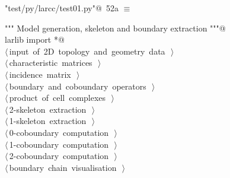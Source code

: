 \documentclass[11pt,oneside]{article}    %
\begin{document}
\begin{flushleft} \small \label{scrap85}
\protect{}\verb@"test/py/larcc/test01.py"@\nobreak\ {\footnotesize 52a }$\equiv$
\vspace{-1ex}
\begin{list}{}{} \item
\mbox{}\verb@""" Model generation, skeleton and boundary extraction """@\\
\mbox{}\verb@from larlib import *@\\
\mbox{}\verb@@\hbox{$\langle\,$input of 2D topology and geometry data\nobreak\ {\footnotesize {}}$\,\rangle$}\verb@@\\
\mbox{}\verb@@\hbox{$\langle\,$characteristic matrices\nobreak\ {\footnotesize {}}$\,\rangle$}\verb@@\\
\mbox{}\verb@@\hbox{$\langle\,$incidence matrix\nobreak\ {\footnotesize {}}$\,\rangle$}\verb@@\\
\mbox{}\verb@@\hbox{$\langle\,$boundary and coboundary operators\nobreak\ {\footnotesize {}}$\,\rangle$}\verb@@\\
\mbox{}\verb@@\hbox{$\langle\,$product of cell complexes\nobreak\ {\footnotesize {}}$\,\rangle$}\verb@@\\
\mbox{}\verb@@\hbox{$\langle\,$2-skeleton extraction\nobreak\ {\footnotesize {}}$\,\rangle$}\verb@@\\
\mbox{}\verb@@\hbox{$\langle\,$1-skeleton extraction\nobreak\ {\footnotesize {}}$\,\rangle$}\verb@@\\
\mbox{}\verb@@\hbox{$\langle\,$0-coboundary computation\nobreak\ {\footnotesize {}}$\,\rangle$}\verb@@\\
\mbox{}\verb@@\hbox{$\langle\,$1-coboundary computation\nobreak\ {\footnotesize {}}$\,\rangle$}\verb@@\\
\mbox{}\verb@@\hbox{$\langle\,$2-coboundary computation\nobreak\ {\footnotesize {}}$\,\rangle$}\verb@@\\
\mbox{}\verb@@\hbox{$\langle\,$boundary chain visualisation\nobreak\ {\footnotesize {}}$\,\rangle$}\verb@@\\
\mbox{}\verb@@{\NWsep}
\end{list}
\vspace{-2ex}
\end{flushleft}
\end{document}
